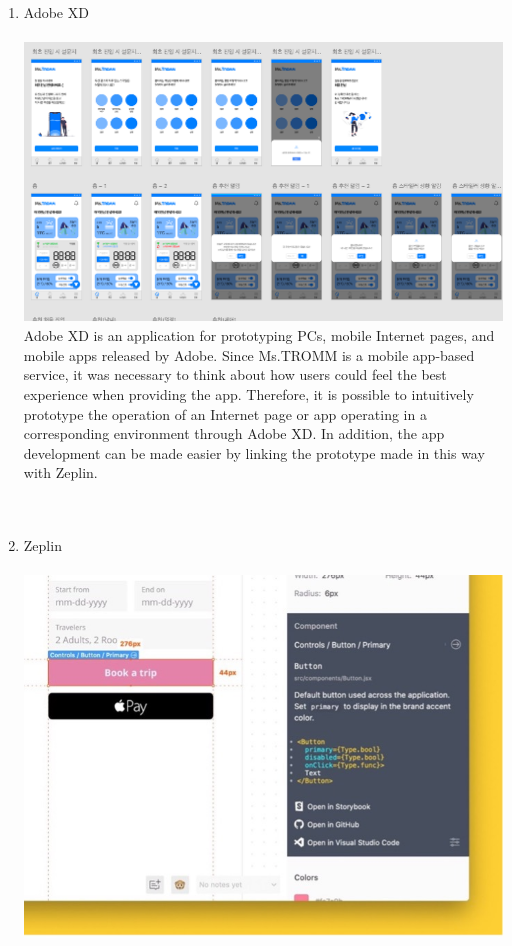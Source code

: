 \documentclass[conference]{IEEEtran}
\begin{document}
\begin{enumerate}
    \item Adobe XD \\ \\
\includegraphics[scale=0.9]{XD.png}
Adobe XD is an application for prototyping PCs, mobile Internet pages, and mobile apps released by Adobe. Since Ms.TROMM is a mobile app-based service, it was necessary to think about how users could feel the best experience when providing the app. Therefore, it is possible to intuitively prototype the operation of an Internet page or app operating in a corresponding environment through Adobe XD. In addition, the app development can be made easier by linking the prototype made in this way with Zeplin.\\ \\ \\
    \item Zeplin\\ \\
    \includegraphics[scale=0.32]{Zp.jpg}

\end{enumerate}
\end{document}
